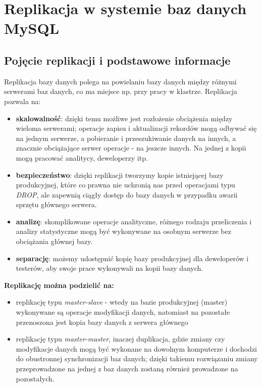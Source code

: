 \chapter{Replikacja w systemie baz danych MySQL}

\section{Pojęcie replikacji i podstawowe informacje}

Replikacja bazy danych polega na powielaniu bazy danych między różnymi serwerami baz danych, co ma miejsce np. przy pracy w klastrze. Replikacja pozwala na:
\begin{itemize}
	\item \textbf{skalowalność}: dzięki temu możliwe jest rozłożenie obciążenia między wieloma serwerami; operacje zapisu i aktualizacji rekordów mogą odbywać się na jednym serwerze, a pobieranie i przeszukiwanie danych na innych, a znacznie obciążające serwer operacje - na jeszcze innych. Na jednej z kopii mogą pracować analitycy, deweloperzy itp.
	\item \textbf{bezpieczeństwo}: dzięki replikacji tworzymy kopie istniejącej bazy produkcyjnej, które co prawna nie uchronią nas przed operacjami typu \textit{DROP}, ale zapewnią ciągły dostęp do bazy danych w przypadku awarii sprzętu głównego serwera.
	\item \textbf{analizę}: skomplikowane operacje analityczne, różnego rodzaju przeliczenia i analizy statystyczne mogą być wykonywane na osobnym serwerze bez obciążania głównej bazy.
	\item \textbf{separację}: możemy udostępnić kopię bazy produkcyjnej dla deweloperów i testerów, aby swoje prace wykonywali na kopii bazy danych.
	
\end{itemize}

\textbf{Replikację można podzielić na:}
\begin{itemize}
	\item replikację typu \textit{master-slave} - wtedy na bazie produkcyjnej (master) wykonywane są operacje modyfikacji danych, natomiast na pozostałe przenoszona jest kopia bazy danych z serwera głównego
	\item replikację typu \textit{master-master}, inaczej duplikacja, gdzie zmiany czy modyfikacje danych mogą być wykonane na dowolnym komputerze i dochodzi do obustronnej synchronizacji baz danych; dzięki takiemu rozwiązaniu zmiany przeprowadzone na jednej z baz danych zostaną również prowadzone na pozostałych.
\end{itemize}

